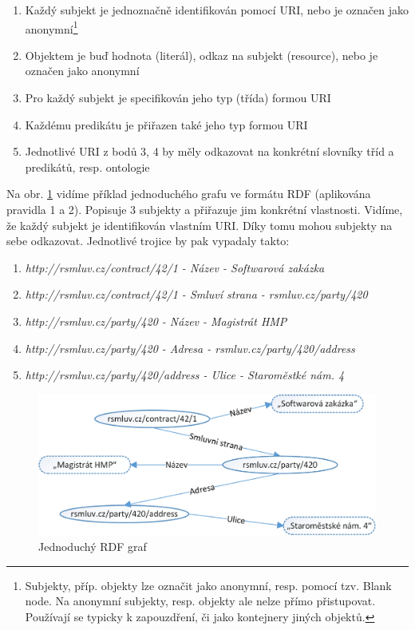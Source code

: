 \begin{enumerate}
\item Každý subjekt je jednoznačně identifikován pomocí URI, nebo je označen jako anonymní\footnote{Subjekty, příp. objekty lze označit jako anonymní, resp. pomocí tzv. Blank node. Na anonymní subjekty, resp. objekty ale nelze přímo přistupovat. Používají se typicky k zapouzdření, či jako kontejnery jiných objektů.} 
\item Objektem je buď hodnota (literál), odkaz na subjekt (resource), nebo je označen jako anonymní
\item Pro každý subjekt je specifikován jeho typ (třída) formou URI
\item Každému predikátu je přiřazen také jeho typ formou URI
\item Jednotlivé URI z bodů 3, 4 by měly odkazovat na konkrétní slovníky tříd a predikátů, resp. ontologie
\end{enumerate}

Na obr. \ref{obr:rdf_graph} vidíme příklad jednoduchého grafu ve formátu RDF (aplikována pravidla 1 a 2). Popisuje 3 subjekty a přiřazuje jim konkrétní vlastnosti. Vidíme, že každý subjekt je identifikován vlastním URI. Díky tomu mohou subjekty na sebe odkazovat. Jednotlivé trojice by pak vypadaly takto:

\begin{enumerate}
\item \textit{http://rsmluv.cz/contract/42/1 - Název - Softwarová zakázka}   
\item \textit{http://rsmluv.cz/contract/42/1 - Smluví strana - rsmluv.cz/party/420}
\item \textit{http://rsmluv.cz/party/420 - Název - Magistrát HMP}
\item \textit{http://rsmluv.cz/party/420 - Adresa - rsmluv.cz/party/420/address}
\item \textit{http://rsmluv.cz/party/420/address - Ulice - Staroměstké nám. 4}
\end{enumerate}

\begin{figure}[h]
\centerline{\includegraphics[width=\textwidth]{img/rdf_graph.eps}}
\caption{Jednoduchý RDF graf}
\label{obr:rdf_graph}
\end{figure}

